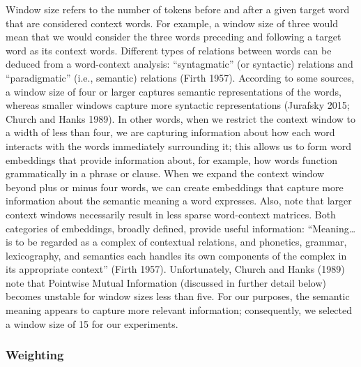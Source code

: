 \documentclass{article}
\begin{document}
Window size refers to the number of tokens before and after a given
target word that are considered context words. For example, a window
size of three would mean that we would consider the three words
preceding and following a target word as its context words. Different
types of relations between words can be deduced from a word-context
analysis: ``syntagmatic'' (or syntactic) relations and ``paradigmatic''
(i.e., semantic) relations (Firth 1957). According to some sources, a
window size of four or larger captures semantic representations of the
words, whereas smaller windows capture more syntactic representations
(Jurafsky 2015; Church and Hanks 1989). In other words, when we restrict
the context window to a width of less than four, we are capturing
information about how each word interacts with the words immediately
surrounding it; this allows us to form word embeddings that provide
information about, for example, how words function grammatically in a
phrase or clause. When we expand the context window beyond plus or minus
four words, we can create embeddings that capture more information about
the semantic meaning a word expresses. Also, note that larger context
windows necessarily result in less sparse word-context matrices. Both
categories of embeddings, broadly defined, provide useful information:
``Meaning\ldots{} is to be regarded as a complex of contextual
relations, and phonetics, grammar, lexicography, and semantics each
handles its own components of the complex in its appropriate context''
(Firth 1957). Unfortunately, Church and Hanks (1989) note that Pointwise
Mutual Information (discussed in further detail below) becomes unstable
for window sizes less than five. For our purposes, the semantic meaning
appears to capture more relevant information; consequently, we selected
a window size of 15 for our experiments.

\hypertarget{weighting}{%
\subsubsection{Weighting}\label{weighting}}
\end{document}
